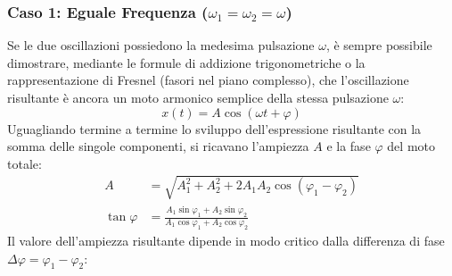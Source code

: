 \subsubsection{Caso 1: Eguale Frequenza ($\omega_1 = \omega_2 = \omega$)}
Se le due oscillazioni possiedono la medesima pulsazione $\omega$, è sempre possibile dimostrare, mediante le formule di addizione trigonometriche o la rappresentazione di Fresnel (fasori nel piano complesso), che l'oscillazione risultante è ancora un moto armonico semplice della stessa pulsazione $\omega$:
\begin{equation}
    x(t) = A \cos(\omega t + \varphi)
\end{equation}
Uguagliando termine a termine lo sviluppo dell'espressione risultante con la somma delle singole componenti, si ricavano l'ampiezza $A$ e la fase $\varphi$ del moto totale:
\begin{align*}
A &= \sqrt{A_1^2 + A_2^2 + 2A_1 A_2 \cos(\varphi_1 - \varphi_2)} \\
\tan\varphi &= \frac{A_1 \sin\varphi_1 + A_2 \sin\varphi_2}{A_1 \cos\varphi_1 + A_2 \cos\varphi_2}
\end{align*}
Il valore dell'ampiezza risultante dipende in modo critico dalla differenza di fase $\Delta\varphi = \varphi_1 - \varphi_2$:

